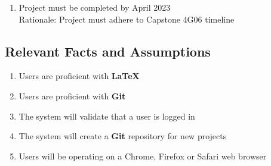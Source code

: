 \documentclass[12pt, titlepage]{article}
\begin{document}
	\begin{enumerate}[{MC}1.]
		\item Project must be completed by April 2023
		\\Rationale: Project must adhere to Capstone 4G06 timeline
	\end{enumerate}
	
	
	
	\subsection{Relevant Facts and Assumptions}
	
	\begin{enumerate}
		\item Users are proficient with \textbf{LaTeX}
		\item Users are proficient with \textbf{Git}
		\item The system will validate that a user is logged in
		\item The system will create a \textbf{Git} repository for new projects
		\item Users will be operating on a Chrome, Firefox or Safari web browser
	\end{enumerate}
	
\end{document}
